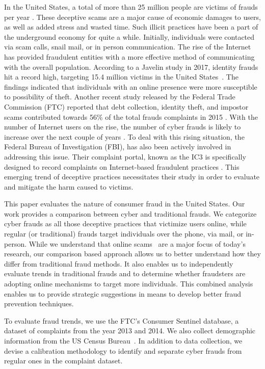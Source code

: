 \documentclass[conference]{IEEEtran}
\begin{document}
In the United States, a total of more than 25 million people are victims of
frauds per year \cite{anderson2013consumer}. These deceptive scams are a major
cause of economic damages to users, as well as added stress and wasted time.
Such illicit practices have been a part of the underground economy for quite a
while. Initially, individuals were contacted via scam calls,  snail mail, or in
person communication.  The rise of the Internet has provided fraudulent
entities with a more effective method of communicating with the overall
population. According to a Javelin study in 2017, identity frauds hit a record
high, targeting 15.4 million victims in the United
States~\cite{identiytheftonline}. The findings indicated that individuals with
an online presence were more susceptible to possibility of theft. Another
recent study released by the  Federal Trade Commission (FTC) reported that debt
collection, identity theft, and impostor scams contributed towards 56\% of the
total frauds complaints in 2015 \cite{ftcpress2016} . With the number of
Internet users on the rise, the number of cyber frauds is likely to increase
over the next couple of years \cite{perharassment}. To deal with this rising
situation, the Federal Bureau of Investigation (FBI), has also been actively
involved in addressing this issue. Their complaint portal, known as the IC3 is
specifically designed to record complaints on Internet-based fraudulent
practices \cite{fbiic3}. This emerging trend of deceptive practices
necessitates their study in order to evaluate and mitigate the harm caused to
victims.

This paper evaluates the nature of consumer fraud in the United States. Our
work provides a comparison between cyber and traditional frauds. We categorize
cyber frauds as all those deceptive practices that victimize users online,
while regular (or traditional) frauds target individuals over the phone, via
mail, or in-person. While we understand that online
scams~\cite{miramirkhani2016dial} are a major focus of today's research, our
comparison based approach allows us to better understand how they differ from
traditional fraud methods. It also enables us to independently evaluate trends
in traditional frauds and to determine whether fraudsters are adopting online
mechanisms to target more individuals. This combined analysis enables us to
provide strategic suggestions in means to develop better fraud prevention
techniques.

To evaluate fraud trends, we use the FTC's Consumer Sentinel database, a dataset of complaints from the year 2013 and 2014. We also collect demographic information from the US Census Bureau~\cite{uscensus}. In addition to data collection, we devise a calibration methodology to identify and separate cyber frauds from regular ones in the complaint dataset. 
\end{document}
